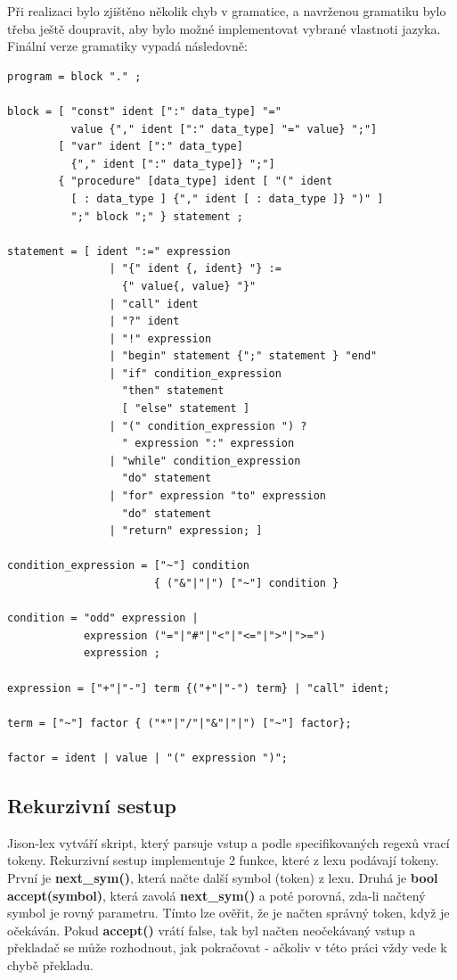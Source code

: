 \documentclass[12pt, letterpaper]{article}
\begin{document}
Při realizaci bylo zjištěno několik chyb v gramatice, a navrženou gramatiku bylo třeba ještě doupravit, aby bylo
možné implementovat vybrané vlastnoti jazyka. Finální verze gramatiky vypadá následovně:
%
\begin{lstlisting}[caption=Finální gramatika, captionpos=b]
program = block "." ;

block = [ "const" ident [":" data_type] "=" 
          value {"," ident [":" data_type] "=" value} ";"]
        [ "var" ident [":" data_type] 
          {"," ident [":" data_type]} ";"]
        { "procedure" [data_type] ident [ "(" ident 
          [ : data_type ] {"," ident [ : data_type ]} ")" ]
          ";" block ";" } statement ;

statement = [ ident ":=" expression 
                | "{" ident {, ident} "} := 
                  {" value{, value} "}" 
                | "call" ident
                | "?" ident
                | "!" expression 
                | "begin" statement {";" statement } "end" 
                | "if" condition_expression 
                  "then" statement 
                  [ "else" statement ]
                | "(" condition_expression ") ? 
                  " expression ":" expression
                | "while" condition_expression 
                  "do" statement
                | "for" expression "to" expression 
                  "do" statement
                | "return" expression; ]

condition_expression = ["~"] condition 
                       { ("&"|"|") ["~"] condition }

condition = "odd" expression |
            expression ("="|"#"|"<"|"<="|">"|">=") 
            expression ;

expression = ["+"|"-"] term {("+"|"-") term} | "call" ident;

term = ["~"] factor { ("*"|"/"|"&"|"|") ["~"] factor};

factor = ident | value | "(" expression ")";
\end{lstlisting}
%
\subsection{Rekurzivní sestup}
Jison-lex vytváří skript, který parsuje vstup a podle specifikovaných regexů vrací tokeny. Rekurzivní sestup 
implementuje 2 funkce, které z lexu podávají tokeny. První je \textbf{next\_sym()}, která načte další symbol (token) z
lexu. Druhá je \textbf{bool accept(symbol)}, která zavolá \textbf{next\_sym()} a poté porovná, zda-li načtený symbol je 
rovný parametru. Tímto lze ověřit, že je načten správný token, když je očekáván. Pokud \textbf{accept()} vrátí false,
tak byl načten neočekávaný vstup a překladač se může rozhodnout, jak pokračovat - ačkoliv v této práci vždy vede
k chybě překladu.
\end{document}
